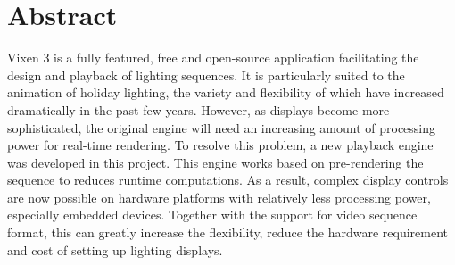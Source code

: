 \renewcommand{\baselinestretch}{1.5}
\chapter{Abstract}
\renewcommand{\baselinestretch}{\mystretch}


Vixen 3 is a fully featured, free and open-source application facilitating the design and playback of lighting sequences. It is particularly suited to the animation of holiday lighting, the variety and flexibility of which have increased dramatically in the past few years. However, as displays become more sophisticated, the original engine will need an increasing amount of processing power for real-time rendering. To resolve this problem, a new playback engine was developed in this project. This engine works based on pre-rendering the sequence to reduces runtime computations. As a result, complex display controls are now possible on hardware platforms with relatively less processing power, especially embedded devices. Together with the support for video sequence format, this can greatly increase the flexibility, reduce the hardware requirement and cost of setting up lighting displays.

